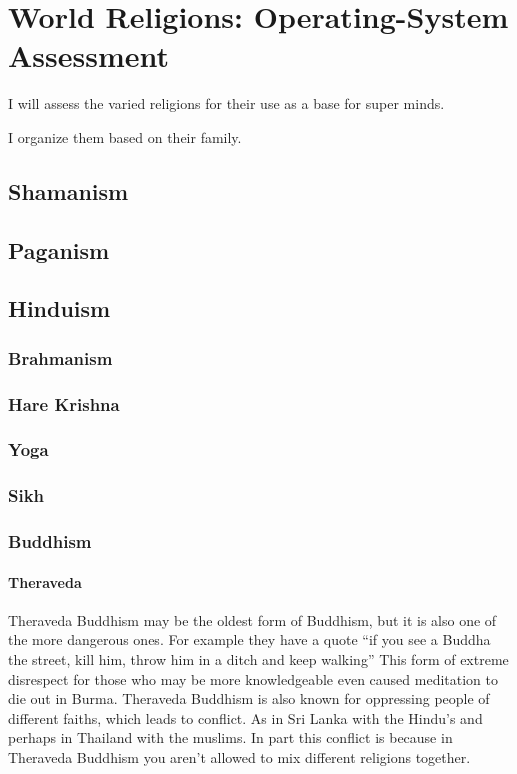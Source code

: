 \part{World Religions: Operating-System Assessment}\label{worldreligions}

I will assess the varied religions for their use as a base for super minds.

I organize them based on their family.  

\chapter{Shamanism}
\chapter{Paganism}
\chapter{Hinduism}
\section{Brahmanism}
\section{Hare Krishna}
\section{Yoga}
\section{Sikh}
\section{Buddhism}
\subsection{Theraveda}
Theraveda Buddhism may be the oldest form of Buddhism, but it is also one of the 
more dangerous ones.
For example they have a quote ``if you see a Buddha the street, kill him,
throw him in a ditch and keep walking''
This form of extreme disrespect for those who may be more knowledgeable even
caused meditation to die out in Burma.
Theraveda Buddhism is also known for oppressing people of different faiths,
which leads to conflict. As in Sri Lanka with the Hindu's and perhaps in
Thailand with the muslims. 
In part this conflict is because in Theraveda Buddhism you aren't allowed to mix
different religions together. 
